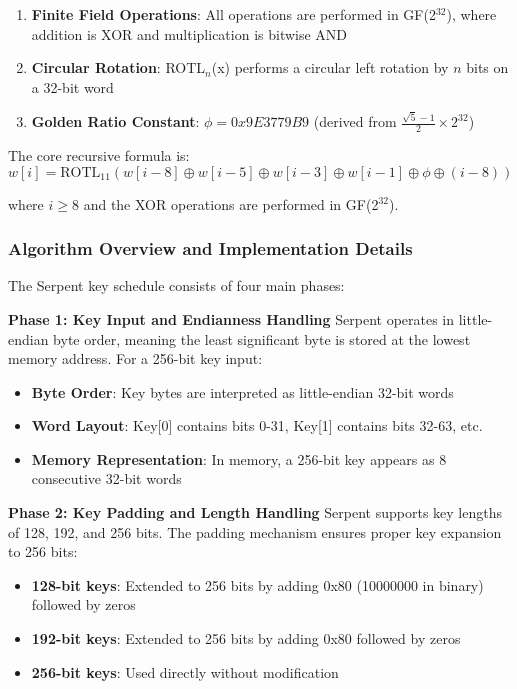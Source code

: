 \documentclass[12pt,a4paper]{article}
\begin{document}
\begin{enumerate}
    \item \textbf{Finite Field Operations}: All operations are performed in GF(2$^{32}$), where addition is XOR and multiplication is bitwise AND
    \item \textbf{Circular Rotation}: ROTL$_n$(x) performs a circular left rotation by $n$ bits on a 32-bit word
    \item \textbf{Golden Ratio Constant}: $\phi = 0x9E3779B9$ (derived from $\frac{\sqrt{5}-1}{2} \times 2^{32}$)
\end{enumerate}

The core recursive formula is:
\begin{equation}
w[i] = \text{ROTL}_{11}(w[i-8] \oplus w[i-5] \oplus w[i-3] \oplus w[i-1] \oplus \phi \oplus (i-8))
\end{equation}

where $i \geq 8$ and the XOR operations are performed in GF(2$^{32}$).

\subsubsection{Algorithm Overview and Implementation Details}

The Serpent key schedule consists of four main phases:

\textbf{Phase 1: Key Input and Endianness Handling}
Serpent operates in little-endian byte order, meaning the least significant byte is stored at the lowest memory address. For a 256-bit key input:

\begin{itemize}
    \item \textbf{Byte Order}: Key bytes are interpreted as little-endian 32-bit words
    \item \textbf{Word Layout}: Key[0] contains bits 0-31, Key[1] contains bits 32-63, etc.
    \item \textbf{Memory Representation}: In memory, a 256-bit key appears as 8 consecutive 32-bit words
\end{itemize}

\textbf{Phase 2: Key Padding and Length Handling}
Serpent supports key lengths of 128, 192, and 256 bits. The padding mechanism ensures proper key expansion to 256 bits:

\begin{itemize}
    \item \textbf{128-bit keys}: Extended to 256 bits by adding 0x80 (10000000 in binary) followed by zeros
    \item \textbf{192-bit keys}: Extended to 256 bits by adding 0x80 followed by zeros
    \item \textbf{256-bit keys}: Used directly without modification
\end{itemize}
\end{document}
